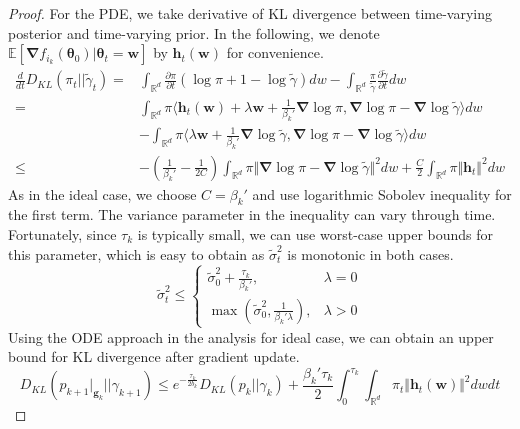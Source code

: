 \documentclass[final,12pt]{colt2018} %
\newcommand{\w}{\bm{w}}
\begin{document}
\begin{proof}
For the PDE, we take derivative of KL divergence between time-varying posterior and time-varying prior. In the following, we denote $\mathbb{E}\left[ \bm{\nabla} f_{i_k}(\bm{\theta}_0)| \bm{\theta}_t=\bm{w}\right]$ by $\bm{h}_t(\w)$ for convenience.
\begin{equation}
  \begin{split}
  \frac{d}{dt}D_{KL}(\pi_t||\tilde{\gamma}_t)=&\int_{\mathbb{R}^d} \frac{\partial \pi}{\partial t}(\log \pi+1-\log \tilde{\gamma})dw-\int_{\mathbb{R}^d} \frac{\pi}{\tilde{\gamma}}\frac{\partial\tilde{\gamma}}{\partial t}dw \\
  =&\int_{\mathbb{R}^d} \pi\langle \bm{h}_t(\bm{w})+\lambda\bm{w} +\frac{1}{\beta_k'}\bm{\nabla} \log \pi, \bm{\nabla} \log \pi-\bm{\nabla} \log \tilde{\gamma}\rangle dw\\
  &-\int_{\mathbb{R}^d} \pi\langle \lambda\bm{w} +\frac{1}{\beta_k'}\bm{\nabla} \log \tilde{\gamma}, \bm{\nabla} \log \pi-\bm{\nabla} \log \tilde{\gamma}\rangle dw\\
  \leq &-\left(\frac{1}{\beta_k'}-\frac{1}{2C}\right)\int_{\mathbb{R}^d} \pi\Vert \bm{\nabla} \log \pi-\bm{\nabla}\log\tilde{\gamma}\Vert^2dw+\frac{C}{2}\int_{\mathbb{R}^d} \pi \Vert \bm{h}_t\Vert^2dw
  \end{split}
\end{equation}
As in the ideal case, we choose $C=\beta_k'$ and use logarithmic Sobolev inequality for the first term. The variance parameter in the inequality can vary through time. Fortunately, since $\tau_k$ is typically small, we can use worst-case upper bounds for this parameter, which is easy to obtain as $\tilde{\sigma}_t^2$ is monotonic in both cases.
\begin{equation}
\tilde{\sigma}_t^2\leq
  \begin{cases}
    \tilde{\sigma}_0^2+\frac{\tau_k}{\beta_k'},&\lambda=0\\
    \max\left(\tilde{\sigma}_0^2, \frac{1}{\beta_k'\lambda}\right),&\lambda>0
  \end{cases}
\end{equation}
Using the ODE approach in the analysis for ideal case, we can obtain an upper bound for KL divergence after gradient update.
\begin{equation}
    D_{KL}\left(p_{k+1}|_{\bm{g}_k}\Big|\Big|\gamma_{k+1}\right)\leq e^{-\frac{\tau_k}{2b_k}}D_{KL}\left(p_{k}\big|\big|\gamma_{k}\right)+\frac{\beta_k'\tau_k}{2}\int_{0}^{\tau_k} \int_{\mathbb{R}^d} \pi_t \Vert \bm{h}_t(\bm{w})\Vert^2dwdt
  \end{equation}

\end{proof}
\end{document}
